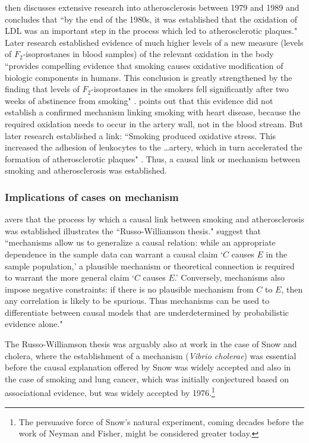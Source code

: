 \documentclass[11pt,reqno,titlepage]{amsart}
\begin{document}
\begin{doublespace}
\citet{Gillies2011-GILTRT-3} then discusses extensive research into atherosclerosis between 1979 and 1989 and concludes that ``by the end of the 1980s, it was established that the oxidation of LDL was an important step in the process which led to atherosclerotic plaques."
Later research established evidence of much higher levels of a new measure (levels of $F_2$-isoprostanes in blood samples) of the relevant oxidation in the body ``provides compelling evidence that smoking causes oxidative modification of biologic components in humans. 
This conclusion is greatly strengthened by the finding that levels of $F_2$-isoprostanes in the smokers fell significantly after two weeks of abstinence from smoking" \citep[pp.\,1201--2]{Morrow:1995gz}.  
\citet[p.\,120]{Gillies2011-GILTRT-3} points out that this evidence did not establish a confirmed mechanism linking smoking with heart disease, because the required oxidation needs to occur in the artery wall, not in the blood stream. 
But later research established a link: ``Smoking produced oxidative stress. 
This increased the adhesion of leukocytes to the \dots artery, which in turn accelerated the formation of atherosclerotic plaques" \citep[p.\,123]{Gillies2011-GILTRT-3}.
Thus, a causal link or mechanism between smoking and atherosclerosis was established.

\subsubsection{Implications of cases on mechanism}
 \citet{Gillies2011-GILTRT-3} avers that the process by which a causal link between smoking and atherosclerosis was established illustrates the ``Russo-Williamson thesis."
 \citet[p.\,159]{Russo:2007iz} suggest that ``mechanisms allow us to generalize a causal relation: while an appropriate dependence in the sample data can warrant a causal claim `$C$ causes $E$ in the sample population,' a plausible mechanism or theoretical connection is required to warrant the more general claim `$C$ causes $E$.' Conversely, mechanisms also impose negative constraints: if there is no plausible mechanism from $C$ to $E$, then any correlation is likely to be spurious. Thus mechanisms can be used to differentiate between causal models that are underdetermined by probabilistic evidence alone."

The Russo-Williamson thesis was arguably also at work in the case of Snow and cholera, where the establishment of a mechanism (\emph{Vibrio cholerae}) was essential before the causal explanation offered by Snow was widely accepted and also in the case of smoking and lung cancer, which was initially conjectured based on associational evidence, but was widely accepted by 1976.\footnote{
The persuasive force of Snow's natural experiment, coming decades before the work of Neyman and Fisher, might be considered greater today.}


\end{doublespace}
\end{document}
